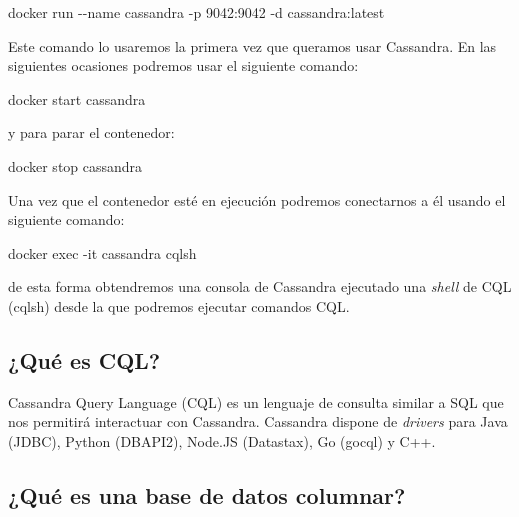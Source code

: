\documentclass[
]{book}
\newenvironment{Shaded}{}{}
\newcommand{\AttributeTok}[1]{\textcolor[rgb]{0.49,0.56,0.16}{#1}}
\newcommand{\ExtensionTok}[1]{#1}
\newcommand{\NormalTok}[1]{#1}
\begin{document}
\begin{Shaded}
\begin{Highlighting}[]
\ExtensionTok{docker}\NormalTok{ run }\AttributeTok{{-}{-}name}\NormalTok{ cassandra }\AttributeTok{{-}p}\NormalTok{ 9042:9042 }\AttributeTok{{-}d}\NormalTok{ cassandra:latest}
\end{Highlighting}
\end{Shaded}

Este comando lo usaremos la primera vez que queramos usar Cassandra. En las siguientes ocasiones podremos usar el siguiente comando:

\begin{Shaded}
\begin{Highlighting}[]
\ExtensionTok{docker}\NormalTok{ start cassandra}
\end{Highlighting}
\end{Shaded}

y para parar el contenedor:

\begin{Shaded}
\begin{Highlighting}[]
\ExtensionTok{docker}\NormalTok{ stop cassandra}
\end{Highlighting}
\end{Shaded}

Una vez que el contenedor esté en ejecución podremos conectarnos a él usando el siguiente comando:

\begin{Shaded}
\begin{Highlighting}[]
\ExtensionTok{docker}\NormalTok{ exec }\AttributeTok{{-}it}\NormalTok{ cassandra cqlsh}
\end{Highlighting}
\end{Shaded}

de esta forma obtendremos una consola de Cassandra ejecutado una \emph{shell} de CQL (cqlsh) desde la que podremos ejecutar comandos CQL.

\subsection{¿Qué es CQL?}\label{quuxe9-es-cql}

Cassandra Query Language (CQL) es un lenguaje de consulta similar a SQL que nos permitirá interactuar con Cassandra. Cassandra dispone de \emph{drivers} para Java (JDBC), Python (DBAPI2), Node.JS (Datastax), Go (gocql) y C++.

\subsection{¿Qué es una base de datos columnar?}\label{quuxe9-es-una-base-de-datos-columnar}
\end{document}
